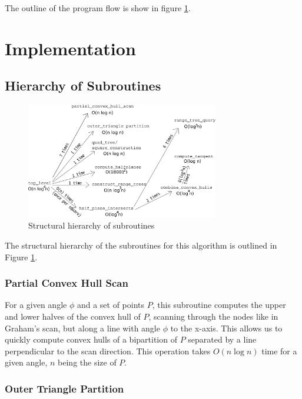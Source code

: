 \documentclass{article}
\newcommand{\figref}[1]{Figure \ref{#1}}
\begin{document}
The outline of the program flow is show in figure \ref{fig:hierarchy}.

\section{Implementation}

\subsection{Hierarchy of Subroutines}

\begin{figure}[ht]
    \centering
    \includegraphics[width=0.75\textwidth]{hierarchy.png}
    \caption{Structural hierarchy of subroutines}
    \label{fig:hierarchy}
\end{figure}

The structural hierarchy of the subroutines for this algorithm is outlined in \figref{fig:hierarchy}.

\subsubsection{Partial Convex Hull Scan}

For a given angle $\phi$ and a set of points $P$, this subroutine computes the upper and lower halves of the convex hull of $P$, scanning through the nodes like in Graham's scan, but along a line with angle $\phi$ to the x-axis. This allows us to quickly compute convex hulls of a bipartition of $P$ separated by a line perpendicular to the scan direction. This operation takes $O(n \log n)$ time for a given angle, $n$ being the size of $P$.

\subsubsection{Outer Triangle Partition}
\end{document}
